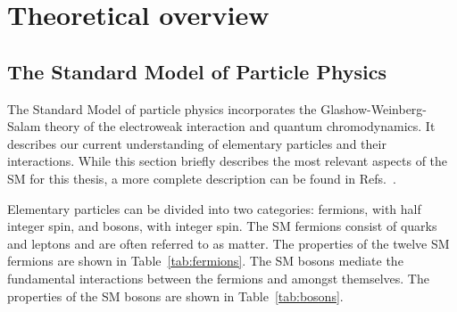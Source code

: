 \section{Theoretical overview}
\label{sec:theory}


\subsection{The Standard Model of Particle Physics}
\label{sec:theory:overview}

The Standard Model of particle physics incorporates the Glashow-Weinberg-Salam theory of the electroweak interaction and quantum chromodynamics. It describes our current understanding of elementary particles and their interactions. While this section briefly describes the most relevant aspects of the SM for this thesis, a more complete description can be found in Refs.~\cite{griffiths,halzen}.

Elementary particles can be divided into two categories: fermions, with half integer spin, and bosons, with integer spin. The SM fermions consist of quarks and leptons and are often referred to as matter. The properties of the twelve SM fermions are shown in Table~\ref{tab:fermions}. The SM bosons mediate the fundamental interactions between the fermions and amongst themselves. The properties of the SM bosons are shown in Table~\ref{tab:bosons}.

